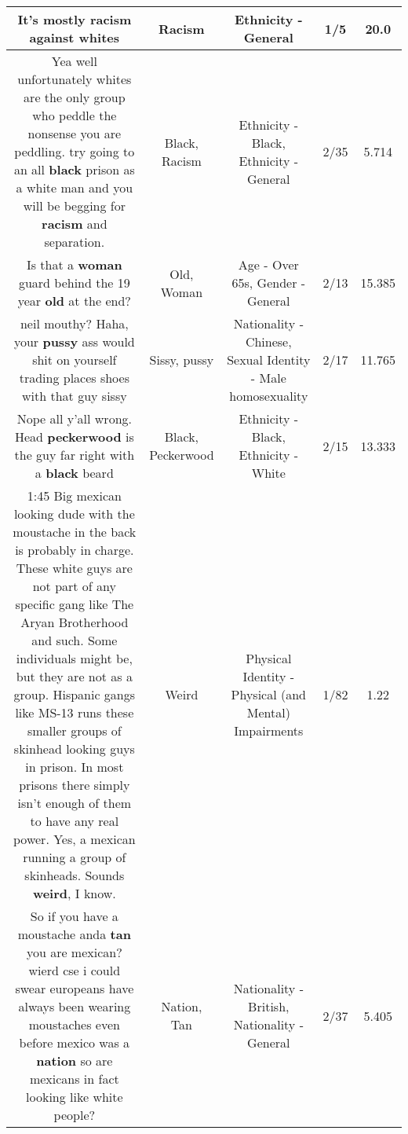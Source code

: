 \documentclass[11pt]{article}
\newlength\mylength
\begin{document}
\begin{center}
\begin{longtable}{|C{.65\mylength}|C{.30\mylength}|C{.12\mylength}|C{.12\mylength}|C{.12\mylength}|}
  \small It's mostly \textbf{racism} against whites\normalsize   & Racism & Ethnicity - General & 1/5 & 20.0 \\  \hline
  \small Yea well unfortunately whites are the only group who peddle the nonsense you are peddling.  try going to an all \textbf{black} prison as a white man and you will be begging for \textbf{racism} and separation.\normalsize   & Black, Racism & Ethnicity - Black, Ethnicity - General & 2/35 & 5.714 \\  \hline
  \small Is that a \textbf{woman} guard behind the 19 year \textbf{old} at the end?\normalsize   & Old, Woman & Age - Over 65s, Gender - General & 2/13 & 15.385 \\  \hline
  \small neil mouthy? Haha, your \textbf{pussy} ass would shit on yourself trading places shoes with that guy sissy\normalsize   & Sissy, pussy & Nationality - Chinese, Sexual Identity - Male homosexuality & 2/17 & 11.765 \\  \hline
  \small Nope all y'all wrong. Head \textbf{peckerwood} is the guy far right with a \textbf{black} beard\normalsize   & Black, Peckerwood & Ethnicity - Black, Ethnicity - White & 2/15 & 13.333 \\  \hline
  \small 1:45 Big mexican looking dude with the moustache in the back is probably in charge. These white guys are not part of any specific gang like The Aryan Brotherhood and such. Some individuals might be, but they are not as a group. Hispanic gangs like MS-13 runs these smaller groups of skinhead looking guys in prison. In most prisons there simply isn't enough of them to have any real power. Yes, a mexican running a group of skinheads. Sounds \textbf{weird}, I know.\normalsize   & Weird & Physical Identity - Physical (and Mental) Impairments & 1/82 & 1.22 \\  \hline
  \small So if you have a moustache anda  \textbf{tan} you are mexican?  wierd cse i could swear europeans have always been wearing moustaches even before mexico was a \textbf{nation} so are mexicans in fact looking like white people?\normalsize   & Nation, Tan & Nationality - British, Nationality - General & 2/37 & 5.405 \\  \hline

\end{longtable}
\end{center}
\end{document}
